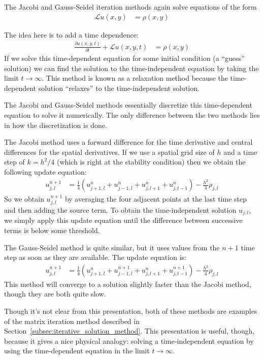 \documentclass[twocolumn]{myarticle}
\begin{document}
The Jacobi and Gauss-Seidel iteration methods again solve equations of the form
\begin{align}
    \mathcal{L} u(x, y) &= \rho(x, y)
\end{align}

The idea here is to add a time dependence:
\begin{align}
    \frac{\partial u(x, y, t)}{\partial t} + \mathcal{L} u(x, y, t) &= \rho(x, y)
\end{align}
If we solve this time-dependent equation for some initial condition (a ``guess'' solution) we can find the solution to the time-independent equation by taking the limit $ t \to \infty $.
This method is known as a relaxation method because the time-dependent solution ``relaxes'' to the time-independent solution.

The Jacobi and Gauss-Seidel methods essentially discretize this time-dependent equation to solve it numerically.
The only difference between the two methods lies in how the discretization is done.

The Jacobi method uses a forward difference for the time derivative and central differences for the spatial derivatives. If we use a spatial grid size of $ h $ and a time step of $ k = h^2/4 $ (which is right at the stability condition) then we obtain the following update equation:
\begin{align}
    u^{n+1}_{j, l} &= \frac{1}{4} \left( u^{n}_{j+1, l} + u^{n}_{j-1, l} + u^{n}_{j, l+1} + u^{n}_{j, l-1} \right) - \frac{h^2}{4} \rho_{j,l}
\end{align}
So we obtain $ u^{n+1}_{j, l} $ by averaging the four adjacent points at the last time step and then adding the source term.
To obtain the time-independent solution $ u_{j, l} $, we simply apply this update equation until the difference between successive terms is below some threshold.

The Gauss-Seidel method is quite similar, but it uses values from the $ n+1 $ time step as soon as they are available.
The update equation is:
\begin{align}
    u^{n+1}_{j, l} &= \frac{1}{4} \left( u^{n}_{j+1, l} + u^{n+1}_{j-1, l} + u^{n}_{j, l+1} + u^{n+1}_{j, l-1} \right) - \frac{h^2}{4} \rho_{j,l}
\end{align}
This method will converge to a solution slightly faster than the Jacobi method, though they are both quite slow.

Though it's not clear from this presentation, both of these methods are examples of the matrix iteration method described in Section~\ref{subsec:iterative_solution_method}.
This presentation is useful, though, because it gives a nice physical analogy: solving a time-independent equation by using the time-dependent equation in the limit $ t \to \infty $.
\end{document}
